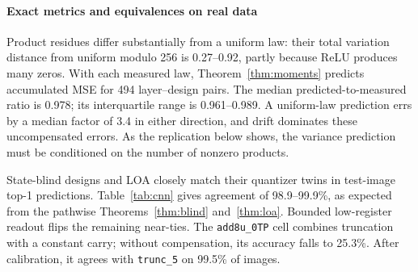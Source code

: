 \documentclass[preprint,12pt,numbers]{elsarticle}
\theoremstyle{definition}
\begin{document}
\paragraph{Exact metrics and equivalences on real data}
Product residues differ substantially from a uniform law: their total
variation distance from uniform modulo 256 is 0.27--0.92, partly
because ReLU produces many zeros. With each measured law,
Theorem~\ref{thm:moments} predicts accumulated MSE for 494
layer--design pairs. The median predicted-to-measured ratio is 0.978;
its interquartile range is 0.961--0.989. A uniform-law prediction
errs by a median factor of 3.4 in either direction, and drift dominates
these uncompensated errors. As the replication below
shows, the variance prediction must be conditioned on the number of
nonzero products.

State-blind designs and LOA closely match their quantizer twins in
test-image top-1 predictions. Table~\ref{tab:cnn} gives agreement of
98.9--99.9\%, as expected from the pathwise
Theorems~\ref{thm:blind} and~\ref{thm:loa}. Bounded low-register
readout flips the remaining near-ties. The \texttt{add8u\_0TP}
cell combines truncation with a constant carry; without compensation,
its accuracy falls to 25.3\%. After calibration, it agrees with
\texttt{trunc\_5} on 99.5\% of images.
\end{document}

